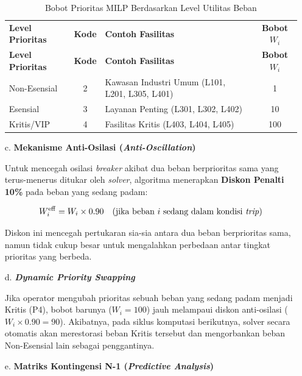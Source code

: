 \begin{enumerate}
\begin{longtable}{|l|c|p{5.5cm}|c|}
    \caption{Bobot Prioritas MILP Berdasarkan Level Utilitas Beban}
    \label{tab:prioritas_milp}
    \vspace{-0.75em}\\
    \hline
    \textbf{Level Prioritas} & \textbf{Kode} & \textbf{Contoh Fasilitas} & \textbf{Bobot $W_i$} \\ \hline
    \endfirsthead
    \hline
    \textbf{Level Prioritas} & \textbf{Kode} & \textbf{Contoh Fasilitas} & \textbf{Bobot $W_i$} \\ \hline
    \endhead
    Non-Esensial & 2 & Kawasan Industri Umum (L101, L201, L305, L401) & 1 \\ \hline
    Esensial     & 3 & Layanan Penting (L301, L302, L402) & 10 \\ \hline
    Kritis/VIP   & 4 & Fasilitas Kritis (L403, L404, L405) & 100 \\ \hline
\end{longtable}

\item[c.] \textbf{Mekanisme Anti-Osilasi (\textit{Anti-Oscillation})}

Untuk mencegah osilasi \textit{breaker} akibat dua beban berprioritas sama yang terus-menerus ditukar oleh \textit{solver}, algoritma menerapkan \textbf{Diskon Penalti 10\%} pada beban yang sedang padam:

\begin{equation}
    W_i^{\mathrm{eff}} = W_i \times 0{.}90
    \quad \text{(jika beban } i \text{ sedang dalam kondisi \textit{trip})}
    \label{eq:anti_osc}
\end{equation}

Diskon ini mencegah pertukaran sia-sia antara dua beban berprioritas sama, namun tidak cukup besar untuk mengalahkan perbedaan antar tingkat prioritas yang berbeda.

\item[d.] \textbf{\textit{Dynamic Priority Swapping}}

Jika operator mengubah prioritas sebuah beban yang sedang padam menjadi Kritis (P4), bobot barunya ($W_i = 100$) jauh melampaui diskon anti-osilasi ($W_i \times 0{.}90 = 90$).
Akibatnya, pada siklus komputasi berikutnya, solver secara otomatis akan merestorasi beban Kritis tersebut dan mengorbankan beban Non-Esensial lain sebagai penggantinya.

\item[e.] \textbf{Matriks Kontingensi N-1 (\textit{Predictive Analysis})}


\end{enumerate}
